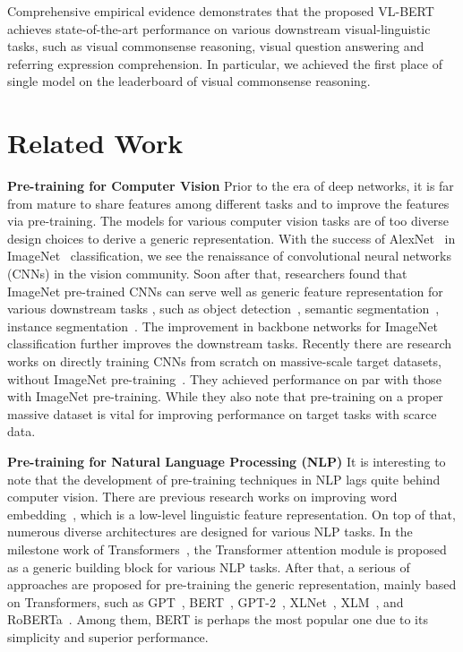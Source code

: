 Comprehensive empirical evidence demonstrates that the proposed VL-BERT achieves state-of-the-art performance on various downstream visual-linguistic tasks, such as visual commonsense reasoning, visual question answering and referring expression comprehension. In particular, we achieved the first place of single model on the leaderboard of visual commonsense reasoning. 

\section{Related Work}

\textbf{Pre-training for Computer Vision} Prior to the era of deep networks, it is far from mature to share features among different tasks and to improve the features via pre-training. The models for various computer vision tasks are of too diverse design choices to derive a generic representation. With the success of AlexNet~\citep{krizhevsky2012alexnet} in ImageNet~\citep{deng2009imagenet} classification, we see the renaissance of convolutional neural networks (CNNs) in the vision community. Soon after that, researchers found that ImageNet pre-trained CNNs can serve well as generic feature representation for various downstream tasks \citep{donahue2014decaf}, such as object detection~\citep{girshick2014rich}, semantic segmentation~\citep{long2015fcn}, instance segmentation~\citep{hariharan2014simultaneous}. The improvement in backbone networks for ImageNet classification further improves the downstream tasks. Recently there are research works on directly training CNNs from scratch on massive-scale target datasets, without ImageNet pre-training~\citep{he2018rethinking}. They achieved performance on par with those with ImageNet pre-training. While they also note that pre-training on a proper massive dataset is vital for improving performance on target tasks with scarce data.  

\textbf{Pre-training for Natural Language Processing (NLP)} It is interesting to note that the development of pre-training techniques in NLP lags quite behind computer vision. There are previous research works on improving word embedding~\citep{mikolov2013efficient,pennington2014glove,kiros2015skip}, which is a low-level linguistic feature representation. On top of that, numerous diverse architectures are designed for various NLP tasks. In the milestone work of Transformers~\citep{vaswani2017transformer}, the Transformer attention module is proposed as a generic building block for various NLP tasks. After that, a serious of approaches are proposed for pre-training the generic representation, mainly based on Transformers, such as GPT~\citep{radford2018GPT}, BERT~\citep{devlin2018bert}, GPT-2~\citep{radford2019GPT-2}, XLNet~\citep{yang2019xlnet}, XLM~\citep{lample2019xlm}, and RoBERTa~\citep{liu2019roberta}. Among them, BERT is perhaps the most popular one due to its simplicity and superior performance.

